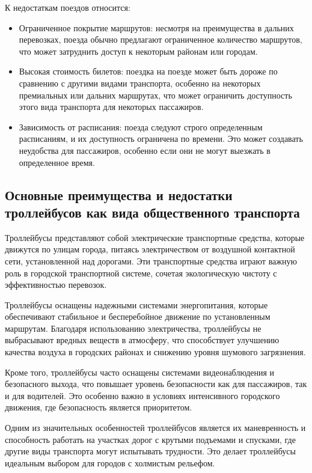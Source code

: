 К недостаткам поездов относится:
\begin{itemize}
	\item Ограниченное покрытие маршрутов: несмотря на преимущества в дальних перевозках, поезда обычно предлагают ограниченное количество маршрутов, что может затруднить доступ к некоторым районам или городам.
	\item Высокая стоимость билетов: поездка на поезде может быть дороже по сравнению с другими видами транспорта, особенно на некоторых премиальных или дальних маршрутах, что может ограничить доступность этого вида транспорта для некоторых пассажиров.
	\item Зависимость от расписания: поезда следуют строго определенным расписаниям, и их доступность ограничена по времени. Это может создавать неудобства для пассажиров, особенно если они не могут выезжать в определенное время.
\end{itemize}

\subsection{Основные преимущества и недостатки троллейбусов как вида общественного транспорта}

Троллейбусы представляют собой электрические транспортные средства, которые движутся по улицам города, питаясь электричеством от воздушной контактной сети, установленной над дорогами. Эти транспортные средства играют важную роль в городской транспортной системе, сочетая экологическую чистоту с эффективностью перевозок.

Троллейбусы оснащены надежными системами энергопитания, которые обеспечивают стабильное и бесперебойное движение по установленным маршрутам. Благодаря использованию электричества, троллейбусы не выбрасывают вредных веществ в атмосферу, что способствует улучшению качества воздуха в городских районах и снижению уровня шумового загрязнения.

Кроме того, троллейбусы часто оснащены системами видеонаблюдения и безопасного выхода, что повышает уровень безопасности как для пассажиров, так и для водителей. Это особенно важно в условиях интенсивного городского движения, где безопасность является приоритетом.

Одним из значительных особенностей троллейбусов является их маневренность и способность работать на участках дорог с крутыми подъемами и спусками, где другие виды транспорта могут испытывать трудности. Это делает троллейбусы идеальным выбором для городов с холмистым рельефом.

